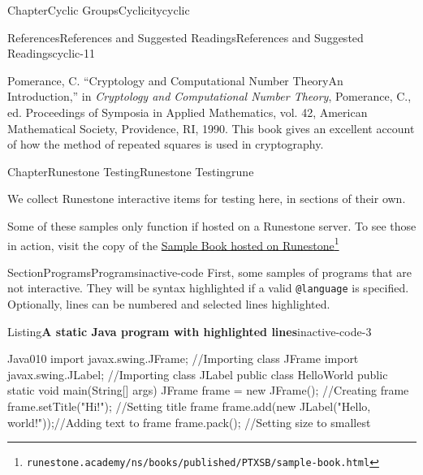 \documentclass[oneside,10pt,]{book}
\newcommand{\mono}[1]{\texttt{#1}}
\numberwithin{equation}{section}
\begin{document}
\begin{chapterptx}{Chapter}{Cyclic Groups}{}{Cyclicity}{}{}{cyclic}
\begin{references-section}{References}{References and Suggested Readings}{}{References and Suggested Readings}{}{}{cyclic-11}
\begin{referencelist}
\hypertarget{biblio-pomerance-1990}{}Pomerance, C. ``Cryptology and Computational Number Theory\textemdash{}An Introduction,'' in \textit{Cryptology and Computational Number Theory}, Pomerance, C., ed. Proceedings of Symposia in Applied Mathematics, vol. 42, American Mathematical Society, Providence, RI, 1990.  This book gives an excellent account of how the method of repeated squares is used in cryptography.
\end{referencelist}
\end{references-section}
\end{chapterptx}
%
%
\typeout{************************************************}
\typeout{************************************************}
%
\begin{chapterptx}{Chapter}{Runestone Testing}{}{Runestone Testing}{}{}{rune}
\renewcommand*{\chaptername}{Chapter}
\begin{introduction}{}%
We collect Runestone interactive items for testing here, in sections of their own.%
\par
Some of these samples only function if hosted on a Runestone server. To see those in action, visit the copy of the \href{https://runestone.academy/ns/books/published/PTXSB/sample-book.html}{Sample Book hosted on Runestone}\footnote{\nolinkurl{runestone.academy/ns/books/published/PTXSB/sample-book.html}\label{rune-2-2-2}}%
\end{introduction}%
%
%
\typeout{************************************************}
\typeout{************************************************}
%
\begin{sectionptx}{Section}{Programs}{}{Programs}{}{}{inactive-code}
First, some samples of programs that are not interactive. They will be syntax highlighted if a valid \mono{@language} is specified. Optionally, lines can be numbered and selected lines highlighted.%
\begin{listingptx}{Listing}{\textbf{A static Java program with highlighted lines}}{inactive-code-3}{}%
\begin{programnumbered}{Java}{0}{1}{0}
import javax.swing.JFrame;  //Importing class JFrame
import javax.swing.JLabel;  //Importing class JLabel
public class HelloWorld {
    public static void main(String[] args) {
        JFrame frame = new JFrame();           //Creating frame
        frame.setTitle("Hi!");                 //Setting title frame
        frame.add(new JLabel("Hello, world!"));//Adding text to frame
        frame.pack();                          //Setting size to smallest
}}
\end{programnumbered}
\end{listingptx}
\end{sectionptx}
\end{chapterptx}
\end{document}
